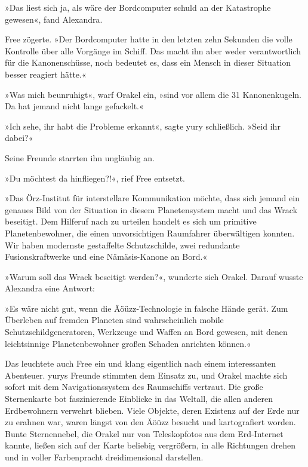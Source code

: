 »Das liest sich ja, als wäre der Bordcomputer schuld an der Katastrophe gewesen«, fand Alexandra.

Free zögerte. »Der Bordcomputer hatte in den letzten zehn Sekunden die volle Kontrolle über alle Vorgänge im Schiff. Das macht ihn aber weder verantwortlich für die Kanonenschüsse, noch bedeutet es, dass ein Mensch in dieser Situation besser reagiert hätte.«

»Was mich beunruhigt«, warf Orakel ein, »sind vor allem die 31 Kanonenkugeln. Da hat jemand nicht lange gefackelt.«

»Ich sehe, ihr habt die Probleme erkannt«, sagte yury schließlich. »Seid ihr dabei?«

Seine Freunde starrten ihn ungläubig an.

»Du möchtest da hinfliegen?!«, rief Free entsetzt.

»Das Örz-Institut für interstellare Kommunikation möchte, dass sich jemand ein genaues Bild von der Situation in diesem Planetensystem macht und das Wrack beseitigt. Dem Hilferuf nach zu urteilen handelt es sich um primitive Planetenbewohner, die einen unvorsichtigen Raumfahrer überwältigen konnten. Wir haben modernste gestaffelte Schutzschilde, zwei redundante Fusionskraftwerke und eine Nämäsis-Kanone an Bord.«

»Warum soll das Wrack beseitigt werden?«, wunderte sich Orakel. Darauf wusste Alexandra eine Antwort:

»Es wäre nicht gut, wenn die Äöüzz-Technologie in falsche Hände gerät. Zum Überleben auf fremden Planeten sind wahrscheinlich mobile Schutzschildgeneratoren, Werkzeuge und Waffen an Bord gewesen, mit denen leichtsinnige Planetenbewohner großen Schaden anrichten können.«

Das leuchtete auch Free ein und klang eigentlich nach einem interessanten Abenteuer. yurys Freunde stimmten dem Einsatz zu, und Orakel machte sich sofort mit dem Navigationssystem des Raumschiffs vertraut. Die große Sternenkarte bot faszinierende Einblicke in das Weltall, die allen anderen Erdbewohnern verwehrt blieben. Viele Objekte, deren Existenz auf der Erde nur zu erahnen war, waren längst von den Äöüzz besucht und kartografiert worden. Bunte Sternennebel, die Orakel nur von Teleskopfotos aus dem Erd-Internet kannte, ließen sich auf der Karte beliebig vergrößern, in alle Richtungen drehen und in voller Farbenpracht dreidimensional darstellen.

\cleardoubleevenpage



